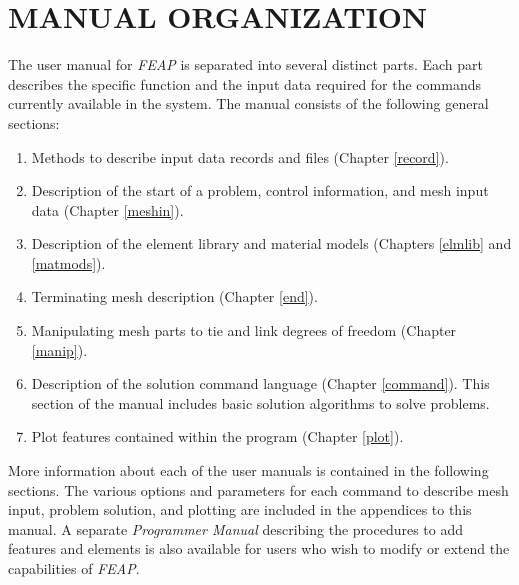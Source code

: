\chapter[Manual Organization]{MANUAL ORGANIZATION}
\label{organ}

The user manual for {\sl FEAP} is separated into several distinct
parts.  Each part describes the specific function and
the input data required for the commands currently available
in the system.  The manual consists of the following general sections:
\begin{enumerate}
\item
Methods to describe input data records and files (Chapter \ref{record}).
\item
Description of the start of a problem,
control information, and mesh input data (Chapter \ref{meshin}).
\item
Description of the element library and material models
(Chapters \ref{elmlib} and \ref{matmods}).
\item
Terminating mesh description (Chapter \ref{end}).
\item
Manipulating mesh parts to tie and link degrees of freedom (Chapter 
\ref{manip}).
\item
Description of the solution command language (Chapter \ref{command}).
This section of the manual includes basic solution algorithms to solve
problems.
\item
Plot features contained within the program (Chapter \ref{plot}).
\end{enumerate}
More information about each of the user manuals is contained in the
following sections.
The various options and parameters for each command to describe
mesh input, problem solution, and plotting are included
in the appendices to this manual.
A separate {\it Programmer Manual} describing the procedures to
add features and elements is also 
available for users who wish to modify or extend the capabilities of {\sl FEAP}.

